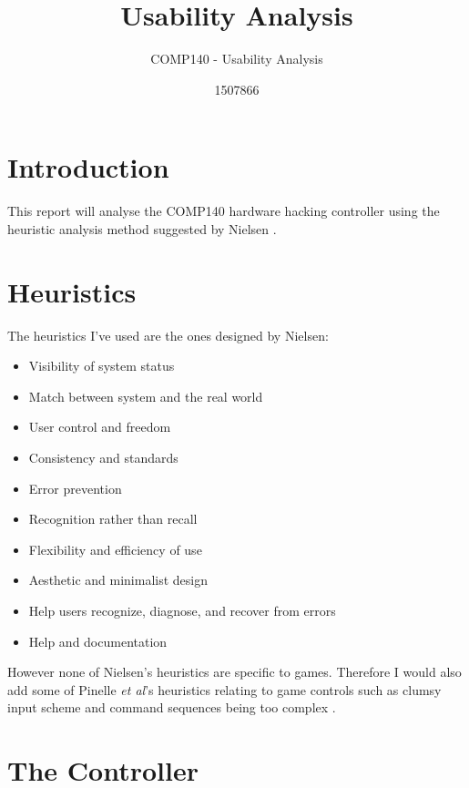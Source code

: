 \documentclass{scrartcl}
\title{Usability Analysis}
\subtitle{COMP140 - Usability Analysis}
\author{1507866}
\begin{document}
	
\maketitle


\section{Introduction}
This report will analyse the COMP140 hardware hacking controller using the heuristic analysis method suggested by Nielsen \cite{HeuristicEvaluation}.

\section{Heuristics}
The heuristics I've used are the ones designed by Nielsen:

\begin{itemize}
	\item Visibility of system status
	\item Match between system and the real world
	\item User control and freedom	
	\item Consistency and standards
	\item Error prevention
	\item Recognition rather than recall
	\item Flexibility and efficiency of use
	\item Aesthetic and minimalist design
	\item Help users recognize, diagnose, and recover from errors	
	\item Help and documentation \cite{NNG}
\end{itemize}

However none of Nielsen's heuristics are specific to games. Therefore I would also add some of Pinelle \textit{et al}'s heuristics relating to game controls such as clumsy input scheme and command sequences being too complex \cite{Pinelle}.

\section{The Controller}
\end{document}
